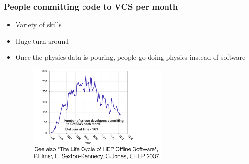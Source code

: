 \documentclass[9pt]{beamer}
\begin{document}
\begin{frame}[fragile]
\frametitle{People committing code to VCS per month}


	\begin{exampleblock}{}
		\begin{itemize}
	\item Variety of skills\\
	\item Huge turn-around\\
	\item Once the physics data is pouring, people go doing physics instead of software\\
		\end{itemize}
	\end{exampleblock}{}
	

\begin{figure}[h]
\begin{center}
\includegraphics[width=8cm,height=5cm]{_figs/cmssw-commits.png}
\end{center}

\end{figure}


\end{frame}
\end{document}
